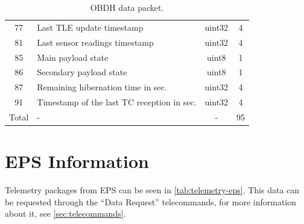 \begin{table}[!ht]
\begin{tabular}{clcc}
		77                  & Last TLE update timestamp                     & uint32             & 4                     \\   
		81                  & Last sensor readings timestamp                & uint32             & 4                     \\   
		85                  & Main payload state                            & uint8              & 1                     \\   
		86                  & Secondary payload state                       & uint8              & 1                     \\   
		87                  & Remaining hibernation time in sec.            & uint32             & 4                     \\   
		91                  & Timestamp of the last TC reception in sec.    & uint32             & 4                     \\   
		\midrule                                                                                                    
        Total               & -                                        & -                  & 95                    \\
		\bottomrule[1.5pt]
	\end{tabular}
	\caption{OBDH data packet.}
	\label{tab:telemetry-obdh}
\end{table}

\section{EPS Information}

Telemetry packages from EPS can be seen in \autoref{tab:telemetry-eps}. This data can be requested through the ``Data Request'' telecommands, for more information about it, see \autoref{sec:telecommands}.

